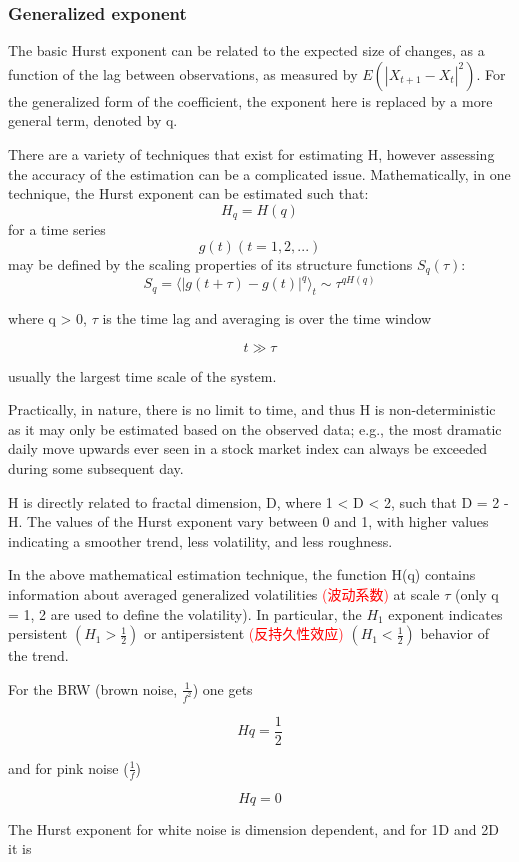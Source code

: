 \documentclass[12pt]{article}
\newcommand{\red}[1]{  \textcolor{red}  {#1}}   %
\begin{document}
\subsubsection{Generalized exponent}
The basic Hurst exponent can be related to the expected size of changes, as a function of the lag between observations, as measured by $E(|X_{t+1}-X_t|^2)$. For the generalized form of the coefficient, the exponent here is replaced by a more general term, denoted by q.

There are a variety of techniques that exist for estimating H, however assessing the accuracy of the estimation can be a complicated issue. Mathematically, in one technique, the Hurst exponent can be estimated such that:
$$H_q = H(q)$$
for a time series
$$g(t) (t = 1, 2,...)$$
may be defined by the scaling properties of its structure functions $S_q(\tau)$:
$$S_q = \langle |g(t + \tau) - g(t)|^q \rangle_t \sim \tau^{qH(q)} $$

where q > 0, $\tau$ is the time lag and averaging is over the time window

$$t \gg \tau$$

usually the largest time scale of the system.

Practically, in nature, there is no limit to time, and thus H is non-deterministic as it may only be estimated based on the observed data; e.g., the most dramatic daily move upwards ever seen in a stock market index can always be exceeded during some subsequent day.

H is directly related to fractal dimension, D, where 1 < D < 2, such that D = 2 - H. The values of the Hurst exponent vary between 0 and 1, with higher values indicating a smoother trend, less volatility, and less roughness.

In the above mathematical estimation technique, the function H(q) contains information about averaged generalized volatilities\red{(波动系数)} at scale $\tau$ (only q = 1, 2 are used to define the volatility). In particular, the $H_1$ exponent indicates persistent $(H_1 > \frac{1}{2})$ or antipersistent\red{(反持久性效应)} $(H_1 < \frac{1}{2})$ behavior of the trend.

For the BRW (brown noise, $\frac{1}{f^2}$) one gets

$$Hq = \frac{1}{2}$$

and for pink noise ($\frac{1}{f}$)

$$Hq = 0$$

The Hurst exponent for white noise is dimension dependent, and for 1D and 2D it is
\end{document}
